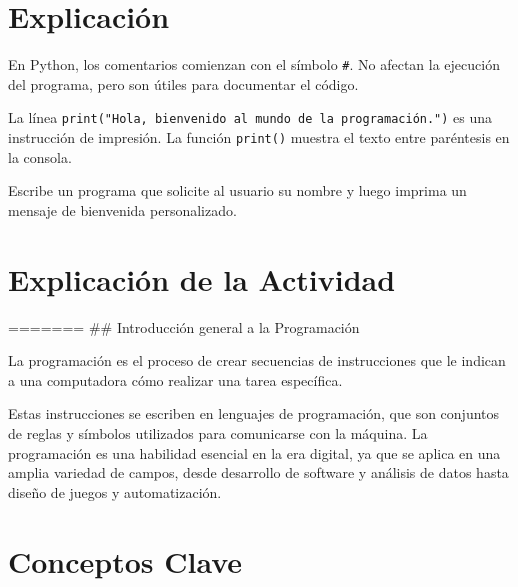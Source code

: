 \documentclass[
  a4paper,
  onepage,
  openany]{scrreprt}
\begin{document}
\hypertarget{explicaciuxf3n}{%
\section{Explicación}\label{explicaciuxf3n}}

En Python, los comentarios comienzan con el símbolo \texttt{\#}. No
afectan la ejecución del programa, pero son útiles para documentar el
código.

La línea
\texttt{print("Hola,\ bienvenido\ al\ mundo\ de\ la\ programación.")} es
una instrucción de impresión. La función \texttt{print()} muestra el
texto entre paréntesis en la consola.

\begin{tcolorbox}[enhanced jigsaw, breakable, opacityback=0, toptitle=1mm, coltitle=black, toprule=.15mm, rightrule=.15mm, colframe=quarto-callout-important-color-frame, opacitybacktitle=0.6, arc=.35mm, title=\textcolor{quarto-callout-important-color}{\faExclamation}\hspace{0.5em}{Actividad Práctica}, titlerule=0mm, colbacktitle=quarto-callout-important-color!10!white, bottomtitle=1mm, bottomrule=.15mm, colback=white, left=2mm, leftrule=.75mm]

Escribe un programa que solicite al usuario su nombre y luego imprima un
mensaje de bienvenida personalizado.

\end{tcolorbox}

\hypertarget{explicaciuxf3n-de-la-actividad}{%
\section{Explicación de la
Actividad}\label{explicaciuxf3n-de-la-actividad}}

======= \#\# Introducción general a la Programación

La programación es el proceso de crear secuencias de instrucciones que
le indican a una computadora cómo realizar una tarea específica.

Estas instrucciones se escriben en lenguajes de programación, que son
conjuntos de reglas y símbolos utilizados para comunicarse con la
máquina. La programación es una habilidad esencial en la era digital, ya
que se aplica en una amplia variedad de campos, desde desarrollo de
software y análisis de datos hasta diseño de juegos y automatización.

\hypertarget{conceptos-clave-1}{%
\section{Conceptos Clave}\label{conceptos-clave-1}}
\end{document}
